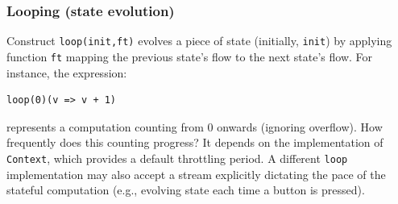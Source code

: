 \subsubsection{Looping (state evolution)}
%
%
%
% 
Construct \lstinline|loop(init,ft)| evolves a piece of state
(initially, \texttt{init})
 by applying function \texttt{ft} mapping the
previous state's flow to the next state's flow.
%
For instance, the expression:
%
\begin{lstlisting}
loop(0)(v => v + 1)
\end{lstlisting}
%
represents a computation counting from $0$ onwards (ignoring overflow).
%
How frequently does this counting progress?
%
It depends on the implementation of \lstinline|Context|,
  which provides a default throttling period.
%
A different \lstinline|loop| implementation may also accept a stream
explicitly dictating the pace of the stateful computation
(e.g., evolving state each time a button is pressed).

